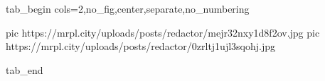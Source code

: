  
 
 
 
 

\ifcmt
  tab_begin cols=2,no_fig,center,separate,no_numbering

     pic https://mrpl.city/uploads/posts/redactor/mejr32nxy1d8f2ov.jpg
		 pic https://mrpl.city/uploads/posts/redactor/0zrltj1ujl3sqohj.jpg

  tab_end
\fi
